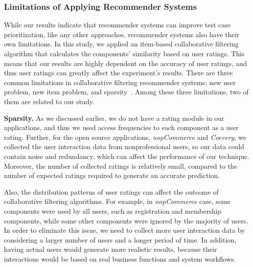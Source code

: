 \vspace*{1pt}
\subsubsection*{Limitations of Applying Recommender Systems}

While our results indicate that recommender systems can 
improve test case prioritization, like any other approaches, recommender 
systems also have their own limitations. 
In this study, we applied an item-based collaborative
filtering algorithm that calculates the components' similarity based
on user ratings. This means that our results are highly dependent on 
the accuracy of user ratings, and thus user ratings can greatly affect 
the experiment's results.
There are three common limitations in collaborative filtering recommender systems;
new user problem, new item problem, and sparsity~\cite{recomsurvey05}. 
Among these three limitations, two of them are related to our study. 

	
	{\textbf{Sparsity.}}	
	As we discussed earlier, we do not have a rating module in our
	applications, and thus we used access frequencies to each component
	as a user rating. Further, for the open source applications, {\em nopCommerce} 
    and {\em Coevery}, we collected the user interaction data
	from nonprofessional users, so our data could contain noise and 
	redundancy, which can affect the performance of our technique. 
	Moreover, the number of collected ratings is relatively small, compared 
	to the number of expected ratings required to generate an accurate prediction.
	
	Also, the distribution patterns of user ratings can affect the outcome
    of collaborative filtering algorithms. For example, in {\em nopCommerce} case, 
	some components were used by all users,
	such as registration and membership components, while some other
	components were ignored by the majority of users. 
	In order to eliminate this issue, we need to collect more user 
    interaction data by considering a larger number of users and a longer 
    period of time.
	In addition, having actual users would generate more realistic results, because
    their interactions would be based on real business functions and system workflows.
	
